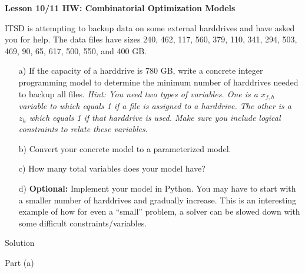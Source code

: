 \documentclass[11pt]{article}
\theoremstyle{definition}
\newcommand{\blu}{\color{blue}}
\begin{document}
\begin{large}
\begin{center}
\textbf{Lesson 10/11 HW: Combinatorial Optimization Models}
\end{center}
\end{large}

ITSD is attempting to backup data on some external harddrives and have asked you for help. The data files have sizes 240, 462, 117, 560, 379, 110, 341, 294, 503, 469, 90, 65, 617, 500, 550, and 400 GB.
\begin{enumerate}
\item[a)] If the capacity of a harddrive is 780 GB, write a concrete integer programming model to determine the minimum number of harddrives needed to backup all files. \emph{Hint: You need two types of variables. One is a $x_{f,h}$ variable to which equals 1 if a file is assigned to a harddrive. The other is a $z_h$ which equals 1 if that harddrive is used. Make sure you include logical constraints to relate these variables}.
\item[b)] Convert your concrete model to a parameterized model.
\item[c)] How many total variables does your model have?
\item[d)] \textbf{Optional:} Implement your model in Python. You may have to start with a smaller number of harddrives and gradually increase. This is an interesting example of how for even a ``small'' problem, a solver can be slowed down with some difficult constraints/variables.
\end{enumerate}

  
{\blu Solution }

Part (a)
\end{document}
